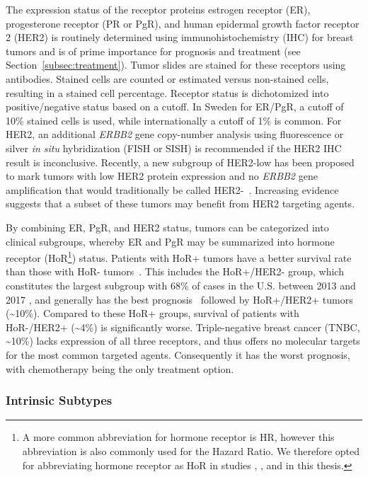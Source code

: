 \documentclass[11pt]{book}
\begin{document}
The expression status of the receptor proteins estrogen receptor (ER), progesterone receptor (PR or PgR), and human epidermal growth factor receptor 2 (HER2) is routinely determined using immunohistochemistry (IHC) for breast tumors and is of prime importance for prognosis and treatment (see Section~\ref{subsec:treatment}). Tumor slides are stained for these receptors using antibodies. Stained cells are counted or estimated versus non-stained cells, resulting in a stained cell percentage. Receptor status is dichotomized into positive/negative status based on a cutoff. In Sweden for ER/PgR, a cutoff of 10\% stained cells is used, while internationally a cutoff of 1\% is common. For HER2, an additional \textit{ERBB2} gene copy-number analysis using fluorescence or silver \textit{in situ} hybridization (FISH or SISH) is recommended if the HER2 IHC result is inconclusive. Recently, a new subgroup of HER2-low has been proposed to mark tumors with low HER2 protein expression and no \textit{ERBB2} gene amplification that would traditionally be called HER2-~\cite{Tarantino:2020}. Increasing evidence suggests that a subset of these tumors may benefit from HER2 targeting agents.

By combining ER, PgR, and HER2 status, tumors can be categorized into clinical subgroups, whereby ER and PgR may be summarized into hormone receptor (HoR\footnote{A more common abbreviation for hormone receptor is HR, however this abbreviation is also commonly used for the Hazard Ratio. We therefore opted for abbreviating hormone receptor as HoR in studies \III, \IV, and in this thesis.}) status. Patients with HoR+ tumors have a better survival rate than those with HoR- tumors~\cite{Bentzon:2008}. This includes the HoR+/HER2- group, which constitutes the largest subgroup with 68\% of cases in the U.S. between 2013 and 2017 \cite{seer-db}, and generally has the best prognosis~\cite{PariseCaggiano:2014} followed by HoR+/HER2+ tumors (\textasciitilde10\%). Compared to these HoR+ groups, survival of patients with HoR-/HER2+ (\textasciitilde4\%) is significantly worse. Triple-negative breast cancer (TNBC, \textasciitilde10\%) lacks expression of all three receptors, and thus offers no molecular targets for the most common targeted agents. Consequently it has the worst prognosis, with chemotherapy being the only treatment option.


\subsubsection{Intrinsic Subtypes}
\end{document}
